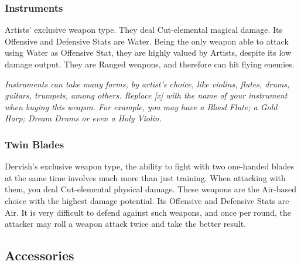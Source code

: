 \begin{tabwpn}[label=inv-staves,range=melee,type=magical,element=crush,roll=firevwater]
    
\end{tabwpn}
\clearpage

\subsubsection{Instruments}

Artists’ exclusive weapon type. They deal Cut-elemental magical damage. Its Offensive and Defensive Stats are Water. Being the only weapon able to attack using Water as Offensive Stat, they are highly valued by Artists, despite its low damage output. They are Ranged weapons, and therefore can hit flying enemies.

\begin{tabwpn}[label=inv-instruments,range=ranged,type=magical,element=cut,roll=watervwater]
    
\end{tabwpn}
{\footnotesize \textit{Instruments can take many forms, by artist’s choice, like violins, flutes, drums, guitars, trumpets, among others. Replace [x] with the name of your instrument when buying this weapon. For example, you may have a Blood Flute; a Gold Harp; Dream Drums or even a Holy Violin.}}
\clearpage

\subsubsection{Twin Blades}

Dervish’s exclusive weapon type, the ability to fight with two one-handed blades at the same time involves much more than just training. When attacking with them, you deal Cut-elemental physical damage. These weapons are the Air-based choice with the highest damage potential. Its Offensive and Defensive Stats are Air. It is very difficult to defend against such weapons, and once per round, the attacker may roll a weapon attack twice and take the better result.

\begin{tabwpn}[label=inv-twin-blades,range=melee,type=physical,element=cut,roll=airvair]
    
\end{tabwpn}
\clearpage

\subsection{Accessories}\label{subsec:inv-accessories}

